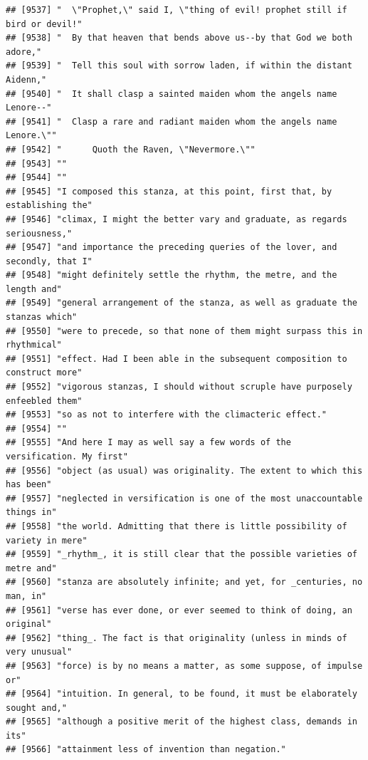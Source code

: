 \documentclass{article}\usepackage[]{graphicx}\usepackage[]{color}
\makeatletter
\newenvironment{kframe}{%
 \def\at@end@of@kframe{}%
 \ifinner\ifhmode%
  \def\at@end@of@kframe{\end{minipage}}%
  \begin{minipage}{\columnwidth}%
 \fi\fi%
 \def\FrameCommand##1{\hskip\@totalleftmargin \hskip-\fboxsep
 \colorbox{shadecolor}{##1}\hskip-\fboxsep
     \hskip-\linewidth \hskip-\@totalleftmargin \hskip\columnwidth}%
 \MakeFramed {\advance\hsize-\width
   \@totalleftmargin\z@ \linewidth\hsize
   \@setminipage}}%
 {\par\unskip\endMakeFramed%
 \at@end@of@kframe}
\newenvironment{knitrout}{}{} %
\makeatother
\begin{document}
\begin{knitrout}
\begin{kframe}
\begin{verbatim}
## [9537] "  \"Prophet,\" said I, \"thing of evil! prophet still if bird or devil!"     
## [9538] "  By that heaven that bends above us--by that God we both adore,"            
## [9539] "  Tell this soul with sorrow laden, if within the distant Aidenn,"           
## [9540] "  It shall clasp a sainted maiden whom the angels name Lenore--"             
## [9541] "  Clasp a rare and radiant maiden whom the angels name Lenore.\""            
## [9542] "      Quoth the Raven, \"Nevermore.\""                                       
## [9543] ""                                                                            
## [9544] ""                                                                            
## [9545] "I composed this stanza, at this point, first that, by establishing the"      
## [9546] "climax, I might the better vary and graduate, as regards seriousness,"       
## [9547] "and importance the preceding queries of the lover, and secondly, that I"     
## [9548] "might definitely settle the rhythm, the metre, and the length and"           
## [9549] "general arrangement of the stanza, as well as graduate the stanzas which"    
## [9550] "were to precede, so that none of them might surpass this in rhythmical"      
## [9551] "effect. Had I been able in the subsequent composition to construct more"     
## [9552] "vigorous stanzas, I should without scruple have purposely enfeebled them"    
## [9553] "so as not to interfere with the climacteric effect."                         
## [9554] ""                                                                            
## [9555] "And here I may as well say a few words of the versification. My first"       
## [9556] "object (as usual) was originality. The extent to which this has been"        
## [9557] "neglected in versification is one of the most unaccountable things in"       
## [9558] "the world. Admitting that there is little possibility of variety in mere"    
## [9559] "_rhythm_, it is still clear that the possible varieties of metre and"        
## [9560] "stanza are absolutely infinite; and yet, for _centuries, no man, in"         
## [9561] "verse has ever done, or ever seemed to think of doing, an original"          
## [9562] "thing_. The fact is that originality (unless in minds of very unusual"       
## [9563] "force) is by no means a matter, as some suppose, of impulse or"              
## [9564] "intuition. In general, to be found, it must be elaborately sought and,"      
## [9565] "although a positive merit of the highest class, demands in its"              
## [9566] "attainment less of invention than negation."                                 

\end{verbatim}
\end{kframe}
\end{knitrout}
\end{document}
